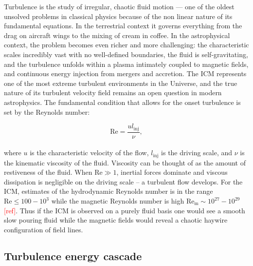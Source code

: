 Turbulence is the study of irregular, chaotic fluid motion — one of the oldest unsolved problems in classical physics because of the non linear nature of its fundamental equations. In the terrestrial context it governs everything from the drag on aircraft wings to the mixing of cream in coffee. In the astrophysical context, the problem becomes even richer and more challenging: the characteristic scales incredibly vast with no well-defined boundaries, the fluid is self-gravitating, and the turbulence unfolds within a plasma intimately coupled to magnetic fields, and continuous energy injection from mergers and accretion. The ICM represents one of the most extreme turbulent environments in the Universe, and the true nature of its turbulent velocity field remains an open question in modern astrophysics.
\pbreak
The fundamental condition that allows for the onset turbulence is set by the Reynolds number:

\begin{equation}
	\mathrm{Re} = \frac{u l_\mathrm{inj}}{\nu},
	\label{eq:reynolds}
\end{equation}
\\
where $u$ is the characteristic velocity of the flow, $l_\mathrm{inj}$ is the driving scale, and $\nu$ is the kinematic viscosity of the fluid. Viscosity can be thought of as the amount of restiveness of the fluid. When $\mathrm{Re} \gg 1$, inertial forces dominate and viscous dissipation is negligible on the driving scale -- a turbulent flow develops. For the ICM, estimates of the hydrodynamic Reynolds number is in the range $\mathrm{Re} \leq 100 - 10^3$ while the magnetic Reynolds number is high $\mathrm{Re_{m}} \sim 10^{27} - 10^{29}$ \textcolor{red}{[ref]}. Thus if the ICM is observed on a purely fluid basis one would see a smooth slow pouring fluid while the magnetic fields would reveal a chaotic haywire configuration of field lines.

\subsection*{Turbulence energy cascade}

